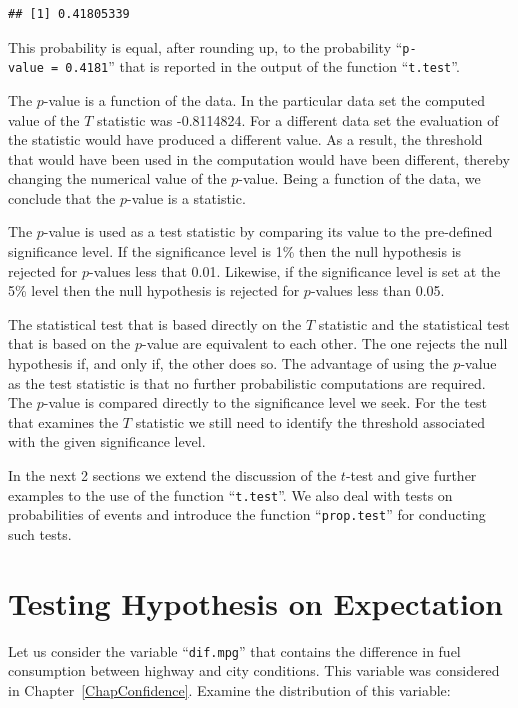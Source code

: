 \documentclass[]{krantz}
\theoremstyle{definition}
\theoremstyle{definition}
\theoremstyle{definition}
\theoremstyle{remark}
\begin{document}
\begin{verbatim}
## [1] 0.41805339
\end{verbatim}

This probability is equal, after rounding up, to the probability
``\texttt{p-value\ =\ 0.4181}'' that is reported in the output of the function
``\texttt{t.test}''.

The \(p\)-value is a function of the data. In the particular data set the
computed value of the \(T\) statistic was -0.8114824. For a different data
set the evaluation of the statistic would have produced a different
value. As a result, the threshold that would have been used in the
computation would have been different, thereby changing the numerical
value of the \(p\)-value. Being a function of the data, we conclude that
the \(p\)-value is a statistic.

The \(p\)-value is used as a test statistic by comparing its value to the
pre-defined significance level. If the significance level is 1\% then the
null hypothesis is rejected for \(p\)-values less that 0.01. Likewise, if
the significance level is set at the 5\% level then the null hypothesis
is rejected for \(p\)-values less than 0.05.

The statistical test that is based directly on the \(T\) statistic and the
statistical test that is based on the \(p\)-value are equivalent to each
other. The one rejects the null hypothesis if, and only if, the other
does so. The advantage of using the \(p\)-value as the test statistic is
that no further probabilistic computations are required. The \(p\)-value
is compared directly to the significance level we seek. For the test
that examines the \(T\) statistic we still need to identify the threshold
associated with the given significance level.

In the next 2 sections we extend the discussion of the \(t\)-test and give
further examples to the use of the function ``\texttt{t.test}''. We also deal
with tests on probabilities of events and introduce the function
``\texttt{prop.test}'' for conducting such tests.

\hypertarget{testing-hypothesis-on-expectation}{%
\section{Testing Hypothesis on Expectation}\label{testing-hypothesis-on-expectation}}

Let us consider the variable ``\texttt{dif.mpg}'' that contains the difference in
fuel consumption between highway and city conditions. This variable was
considered in Chapter~\ref{ChapConfidence}. Examine the distribution of
this variable:
\end{document}
